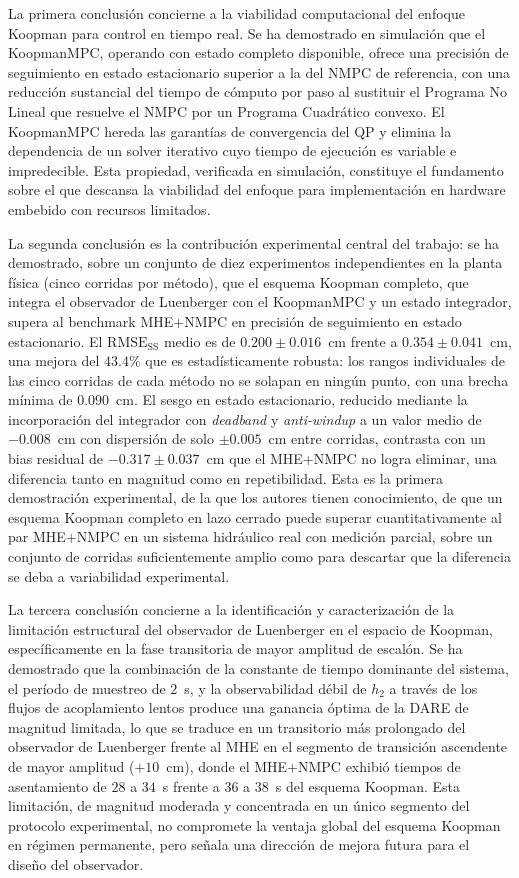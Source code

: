 \documentclass[12pt,letterpaper]{article}
\begin{document}
La primera conclusión concierne a la viabilidad computacional 
del enfoque Koopman para control en tiempo real. Se ha 
demostrado en simulación que el KoopmanMPC, operando con estado 
completo disponible, ofrece una precisión de seguimiento en 
estado estacionario superior a la del NMPC de referencia, con 
una reducción sustancial del tiempo de cómputo por paso al 
sustituir el Programa No Lineal que resuelve el NMPC por un
Programa Cuadrático convexo. El KoopmanMPC hereda las
garantías de convergencia del QP y elimina la dependencia de un
solver iterativo cuyo tiempo de ejecución es variable e
impredecible. Esta propiedad, verificada en simulación, constituye 
el fundamento sobre el que descansa la viabilidad del enfoque 
para implementación en hardware embebido con recursos limitados.

La segunda conclusión es la contribución experimental central
del trabajo: se ha demostrado, sobre un conjunto de diez
experimentos independientes en la planta física (cinco corridas
por método), que el esquema Koopman completo, que integra el
observador de Luenberger con el KoopmanMPC y un estado integrador,
supera al benchmark MHE+NMPC en precisión de seguimiento en estado
estacionario. El $\mathrm{RMSE}_{\mathrm{SS}}$ medio es de
$0.200 \pm 0.016$~cm frente a $0.354 \pm 0.041$~cm, una mejora
del $43.4\%$ que es estadísticamente robusta: los rangos
individuales de las cinco corridas de cada método no se solapan
en ningún punto, con una brecha mínima de $0.090$~cm. El sesgo
en estado estacionario, reducido mediante la incorporación del 
integrador con \textit{deadband} y \textit{anti-windup} a un 
valor medio de $-0.008$~cm con dispersión de solo 
$\pm 0.005$~cm entre corridas, contrasta con un bias residual 
de $-0.317 \pm 0.037$~cm que el MHE+NMPC no logra eliminar, una 
diferencia tanto en magnitud como en repetibilidad. Esta es la 
primera demostración experimental, de la que los autores tienen 
conocimiento, de que un esquema Koopman completo en lazo cerrado 
puede superar cuantitativamente al par MHE+NMPC en un sistema 
hidráulico real con medición parcial, sobre un conjunto de 
corridas suficientemente amplio como para descartar que la 
diferencia se deba a variabilidad experimental.

La tercera conclusión concierne a la identificación y 
caracterización de la limitación estructural del observador de 
Luenberger en el espacio de Koopman, específicamente en la 
fase transitoria de mayor amplitud de escalón. Se ha demostrado 
que la combinación de la constante de tiempo dominante del 
sistema, el período de muestreo de $2$~s, y la observabilidad 
débil de $h_2$ a través de los flujos de acoplamiento lentos 
produce una ganancia óptima de la DARE de magnitud limitada, lo 
que se traduce en un transitorio más prolongado del observador 
de Luenberger frente al MHE en el segmento de transición 
ascendente de mayor amplitud ($+10$~cm), donde el MHE+NMPC 
exhibió tiempos de asentamiento de $28$ a $34$~s frente a 
$36$ a $38$~s del esquema Koopman. Esta limitación, de magnitud 
moderada y concentrada en un único segmento del protocolo 
experimental, no compromete la ventaja global del esquema 
Koopman en régimen permanente, pero señala una dirección de 
mejora futura para el diseño del observador.
\end{document}
